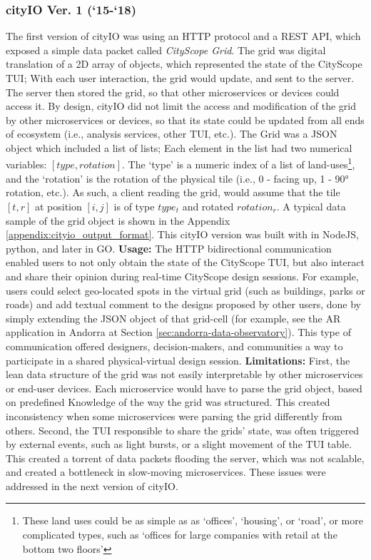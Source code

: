 {{      \subsubsection{cityIO Ver. 1 (`15-`18)}
      {
          The first version of cityIO was using an HTTP protocol and a REST API, which exposed a simple data packet called \textit{CityScope Grid}. The grid was digital translation of a 2D array of objects, which represented the state of the CityScope TUI; With each user interaction, the grid would update, and sent to the server. The server then stored the grid, so that other microservices or devices could access it. By design, cityIO did not limit the access and modification of the grid by other microservices or devices, so that its state could be updated from all ends of ecosystem (i.e., analysis services, other TUI, etc.). The Grid was a JSON object which included a list of lists; Each element in the list had two numerical variables: $[type, rotation]$. The `type' is a numeric index of a list of land-uses\footnote{These land uses could be as simple as as `offices', `housing', or `road', or more complicated types, such as `offices for large companies with retail at the bottom two floors'}, and the `rotation' is the rotation of the physical tile (i.e., 0 - facing up, 1 - 90° rotation, etc.). As such, a client reading the grid, would assume that the tile $[t,r]$ at position $[i,j]$ is of type $type_t$ and rotated $rotation_r$. A typical data sample of the grid object is shown in the Appendix \eqref{appendix:cityio_output_format}. This cityIO version was built with in NodeJS, python, and later in GO.
          \newline
          \textbf{Usage:} The HTTP bidirectional communication enabled users to not only obtain the state of the CityScope TUI, but also interact and share their opinion during real-time CityScope design sessions. For example, users could select geo-located spots in the virtual grid (such as buildings, parks or roads) and add textual comment to the designs proposed by other users, done by simply extending the JSON object of that grid-cell (for example, see the AR application in Andorra at Section \eqref{sec:andorra-data-observatory}). This type of communication offered designers, decision-makers, and communities a way to participate in a shared physical-virtual design session.
          \newline
          \textbf{Limitations:} First, the lean data structure of the grid was not easily interpretable by other microservices or end-user devices. Each microservice would have to parse the grid object, based on predefined Knowledge of the way the grid was structured. This created inconsistency when some microservices were parsing the grid differently from others. Second, the TUI responsible to share the grids' state, was often triggered by external events, such as light bursts, or a slight movement of the TUI table. This created a torrent of data packets flooding the server, which was not scalable, and created a bottleneck in slow-moving microservices. These issues were addressed in the next version of cityIO.
      }



}}
